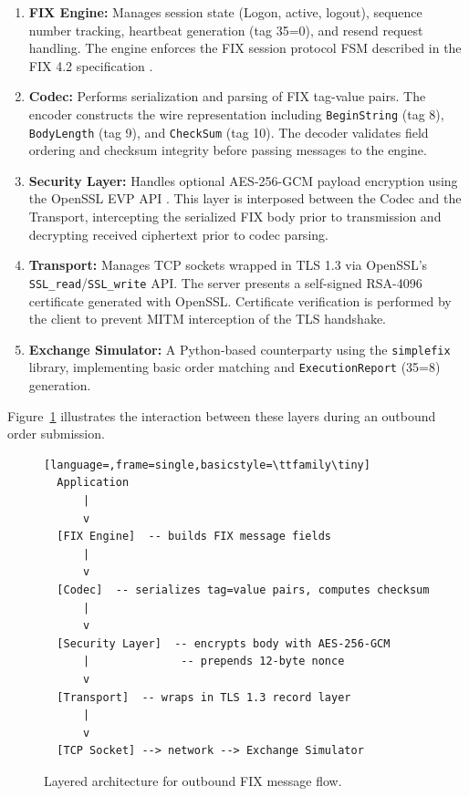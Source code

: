 \documentclass[twocolumn,10pt]{article}
\begin{document}
\begin{enumerate}
    \item \textbf{FIX Engine:} Manages session state (Logon, active, logout),
    sequence number tracking, heartbeat generation (tag 35=0), and resend
    request handling. The engine enforces the FIX session protocol FSM
    described in the FIX 4.2 specification \cite{fix42}.

    \item \textbf{Codec:} Performs serialization and parsing of FIX tag-value
    pairs. The encoder constructs the wire representation including
    \texttt{BeginString} (tag 8), \texttt{BodyLength} (tag 9), and
    \texttt{CheckSum} (tag 10). The decoder validates field ordering and
    checksum integrity before passing messages to the engine.

    \item \textbf{Security Layer:} Handles optional AES-256-GCM payload
    encryption using the OpenSSL EVP API \cite{openssl}. This layer is
    interposed between the Codec and the Transport, intercepting the
    serialized FIX body prior to transmission and decrypting received
    ciphertext prior to codec parsing.

    \item \textbf{Transport:} Manages TCP sockets wrapped in TLS 1.3 via
    OpenSSL's \texttt{SSL\_read}/\texttt{SSL\_write} API. The server presents
    a self-signed RSA-4096 certificate generated with OpenSSL. Certificate
    verification is performed by the client to prevent MITM interception of
    the TLS handshake.

    \item \textbf{Exchange Simulator:} A Python-based counterparty using the
    \texttt{simplefix} library, implementing basic order matching and
    \texttt{ExecutionReport} (35=8) generation.
\end{enumerate}

Figure~\ref{fig:arch} illustrates the interaction between these layers during
an outbound order submission.

\begin{figure}[h]
\centering
\begin{lstlisting}[language=,frame=single,basicstyle=\ttfamily\tiny]
  Application
      |
      v
  [FIX Engine]  -- builds FIX message fields
      |
      v
  [Codec]  -- serializes tag=value pairs, computes checksum
      |
      v
  [Security Layer]  -- encrypts body with AES-256-GCM
      |              -- prepends 12-byte nonce
      v
  [Transport]  -- wraps in TLS 1.3 record layer
      |
      v
  [TCP Socket] --> network --> Exchange Simulator
\end{lstlisting}
\caption{Layered architecture for outbound FIX message flow.}
\label{fig:arch}
\end{figure}
\end{document}
